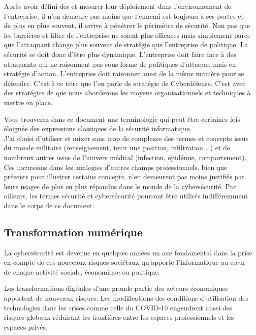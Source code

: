 Après avoir défini des  et mesurer leur déploiement dans l’environnement de l’entreprise, il n’en demeure pas moins que l’ennemi est toujours à ses portes et de plus en plus souvent, il arrive à pénétrer le périmètre de sécurité.
Non pas que les barrières et filtre de l'entreprise ne soient plus efficaces mais simplement parce que l'attaquant change plus souvent de stratégie que l'entreprise de politique. La sécurité se doit donc d'être plus dynamique.
L’entreprise doit faire face à des attaquants qui ne raisonnent pas sous forme de politiques d’attaque, mais en stratégie d'action. L’entreprise doit raisonner aussi de la même manière pour se défendre. C'est à ce titre que l'on parle de stratégie de Cyberdéfense.
C'est avec des stratégies de  que nous aborderons les moyens organisationnels et techniques à mettre en place.

Vous trouverez  dans ce document une terminologie qui peut être certaines fois éloignée des expressions classiques de la sécurité informatique. \\
J'ai choisi d'utiliser et mixer sans trop de complexes des termes et concepts issus du monde militaire (renseignement, tenir une position, infiltration …) et de nombreux autres issus de l'univers médical (infection, épidémie, comportement).\\ Ces incursions dans les analogies d'autres champs professionnels, bien que présents pour illustrer certains concepts, n'en demeurent pas moins justifiés par leurs usages de plus en plus répandus dans le monde de la cybersécurité. Par ailleurs, les termes sécurité et cybersécurité pourront être utilisés indifféremment dans le corps de ce document.

\subsection {Transformation numérique}


La cybersécurité est devenue en quelques années un axe fondamental dans la prise en compte de ces nouveaux risques sociétaux qu'apporte l'informatique au cœur de chaque activité sociale, économique ou politique.

Les  transformations digitales d'une grande partie des acteurs économiques apportent de nouveaux risques. Les modifications des conditions d'utilisation des technologies dans les crises comme celle du COVID-19 engendrent aussi des risques globaux réduisant les frontières entre les espaces professionnels et les espaces privés.

